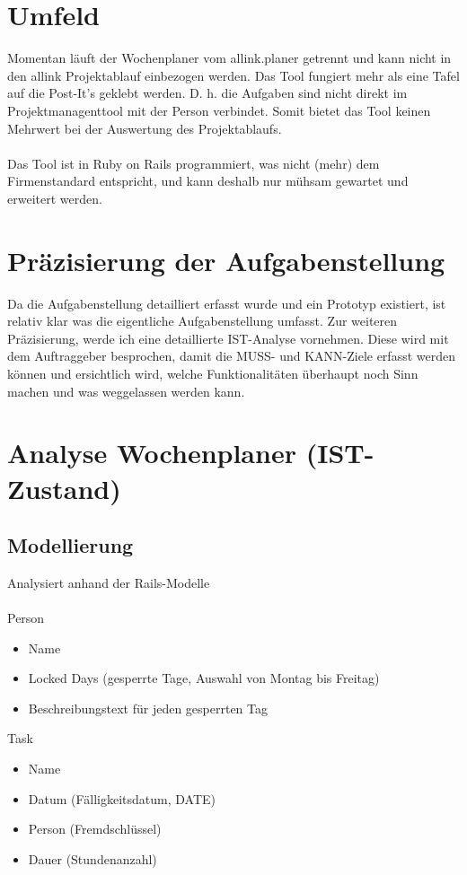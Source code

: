 \section{Umfeld}
Momentan läuft der Wochenplaner vom allink.planer getrennt und kann nicht in den allink Projektablauf einbezogen werden.
Das Tool fungiert mehr als eine Tafel auf die Post-It's geklebt werden. D. h. die Aufgaben sind nicht direkt im Projektmanagenttool mit der Person verbindet.
Somit bietet das Tool keinen Mehrwert bei der Auswertung des Projektablaufs.\\
\\
Das Tool ist in Ruby on Rails programmiert, was nicht (mehr) dem Firmenstandard entspricht, und kann deshalb nur mühsam gewartet und erweitert werden.

\section{Präzisierung der Aufgabenstellung}
Da die Aufgabenstellung detailliert erfasst wurde und ein Prototyp existiert, ist relativ klar was die eigentliche Aufgabenstellung umfasst.
Zur weiteren Präzisierung, werde ich eine detaillierte IST-Analyse vornehmen. Diese wird mit dem Auftraggeber besprochen, 
damit die MUSS- und KANN-Ziele erfasst werden können und ersichtlich wird, welche Funktionalitäten überhaupt noch Sinn machen und was weggelassen werden kann.

\section{Analyse Wochenplaner (IST-Zustand)}

\subsection{Modellierung}
    Analysiert anhand der Rails-Modelle\\
    \\
    Person
    \begin{itemize}
        \item Name
        \item Locked Days (gesperrte Tage, Auswahl von Montag bis Freitag)
        \item Beschreibungstext für jeden gesperrten Tag
    \end{itemize}
    Task
    \begin{itemize}
        \item Name
        \item Datum (Fälligkeitsdatum, DATE)
        \item Person (Fremdschlüssel)
        \item Dauer (Stundenanzahl)
    \end{itemize}

